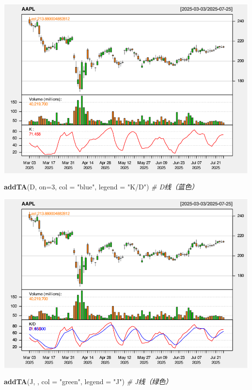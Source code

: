 \documentclass[]{ctexbook}
\newenvironment{Shaded}{\begin{snugshade}}{\end{snugshade}}
\newcommand{\AttributeTok}[1]{\textcolor[rgb]{0.13,0.29,0.53}{#1}}
\newcommand{\CommentTok}[1]{\textcolor[rgb]{0.56,0.35,0.01}{\textit{#1}}}
\newcommand{\DecValTok}[1]{\textcolor[rgb]{0.00,0.00,0.81}{#1}}
\newcommand{\FunctionTok}[1]{\textcolor[rgb]{0.13,0.29,0.53}{\textbf{#1}}}
\newcommand{\NormalTok}[1]{#1}
\newcommand{\StringTok}[1]{\textcolor[rgb]{0.31,0.60,0.02}{#1}}
\begin{document}
\includegraphics[width=0.9\linewidth]{QuantmodHandbook_files/figure-latex/kdj_2-2}

\begin{Shaded}
\begin{Highlighting}[]
\FunctionTok{addTA}\NormalTok{(D, }\AttributeTok{on=}\DecValTok{3}\NormalTok{, }\AttributeTok{col =} \StringTok{"blue"}\NormalTok{, }\AttributeTok{legend =} \StringTok{"K/D"}\NormalTok{)   }\CommentTok{\# D线（蓝色）}
\end{Highlighting}
\end{Shaded}

\includegraphics[width=0.9\linewidth]{QuantmodHandbook_files/figure-latex/kdj_2-3}

\begin{Shaded}
\begin{Highlighting}[]
\FunctionTok{addTA}\NormalTok{(J, , }\AttributeTok{col =} \StringTok{"green"}\NormalTok{, }\AttributeTok{legend =} \StringTok{"J"}\NormalTok{)  }\CommentTok{\# J线（绿色）}
\end{Highlighting}
\end{Shaded}
\end{document}
